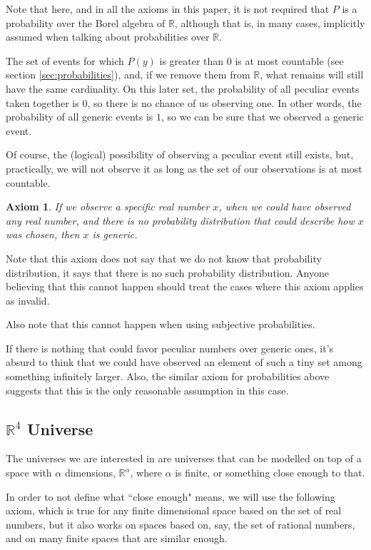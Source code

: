 \documentclass[a4paper
,draft
]{article}
\def\reale{\mathbb{R}}
\newcommand{\ghilimele}[1]{``#1"}
\newtheorem{axiom}{Axiom}
\begin{document}
Note that here, and in all the axioms in this paper, it is not required that
$P$ is a probability over the
Borel algebra of $\reale$, although that is, in many cases, implicitly
assumed when talking about probabilities over $\reale$.

The set of events for which $P(y)$ is
greater than $0$ is at most countable (see section \ref{sec:probabilities}),
and, if we remove them from $\reale$, what remains will still have
the same cardinality.
On this later set, the probability
of all peculiar events taken together is $0$, so there is no chance of us
observing one.
In other words, the probability of all generic events is $1$,
so we can be sure that we observed a generic event.

Of course, the (logical) possibility of observing a peculiar event still exists,
but, practically, we will not observe it as long as the set of our
observations is at most countable.

\begin{axiom}\label{ax:noprobability}
  If we observe a specific real number $x$, when we could have
  observed any real number, and there is no probability distribution that could
  describe how $x$ was chosen, then $x$ is generic.
\end{axiom}

Note that this axiom does not say that we do not know that probability
distribution, it says that there is no such probability distribution.
Anyone believing that this cannot happen should treat the cases where
this axiom applies as invalid.

Also note that this cannot happen when using subjective probabilities.

If there is nothing that could favor
peculiar numbers over generic ones, it's absurd to think that we could have
observed an element of such a tiny set among something infinitely larger.
Also, the similar axiom for probabilities above suggests that this is the only
reasonable assumption in this case.

\subsection{$\reale^4$ Universe}

The universes we are interested in are universes that can be
modelled on top of a space with $\alpha$ dimensions,
$\reale^\alpha$, where $\alpha$ is finite,
or something close enough to that.

In order to not define what \ghilimele{close enough} means, we will use
the following axiom, which is true for any finite dimensional space
based on the set of real numbers, but it also works on spaces based on,
say, the set of rational numbers, and on many finite spaces that are similar
enough.
\end{document}
